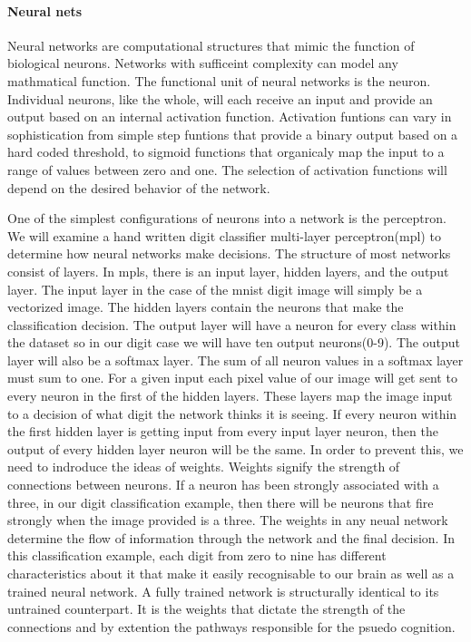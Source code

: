 \documentclass{article}
\begin{document}
{\paragraph{Neural nets}
Neural networks are computational structures that mimic the function of biological neurons. Networks with sufficeint complexity can model any mathmatical function. 
The functional unit of neural networks is the neuron.
Individual neurons, like the whole, will each receive an input and provide an output based on an internal activation function.
Activation funtions can vary in sophistication from simple step funtions that provide a binary output based on a hard coded threshold,
to sigmoid functions that organicaly map the input to a range of values between zero and one.
The selection of activation functions will depend on the desired behavior of the network. 
\par
One of the simplest configurations of neurons into a network is the perceptron.
We will examine a hand written digit classifier multi-layer perceptron(mpl) to determine how neural networks make decisions.
The structure of most networks consist of layers. In mpls, there is an input layer, hidden layers, and the output layer. 
The input layer in the case of the mnist digit image will simply be a vectorized image. The hidden layers contain the neurons that make the classification decision.
The output layer will have a neuron for every class within the dataset so in our digit case we will have ten output neurons(0-9). The output layer will also be a softmax layer. 
The sum of all neuron values in a softmax layer must sum to one.
For a given input each pixel value of our image will get sent to every neuron in the first of the hidden layers.
These layers map the image input to a decision of what digit the network thinks it is seeing.
If every neuron within the first hidden layer is getting input from every input layer neuron, then the output of every hidden layer neuron will be the same. 
In order to prevent this, we need to indroduce the ideas of weights. Weights signify the strength of connections between neurons.
If a neuron has been strongly associated with a three, in our digit classification example, then there will be neurons that fire strongly when the image provided is a three.
The weights in any neual network determine the flow of information through the network and the final decision.
In this classification example, each digit from zero to nine has different characteristics about it that make it easily recognisable to our brain as well as a trained neural network.
A fully trained network is structurally identical to its untrained counterpart. It is the weights that dictate the strength of the connections and by extention the pathways responsible for the psuedo cognition.
}
\end{document}

